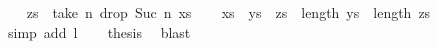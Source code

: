 \begin{isabellebody}
\ \ \isamarkupfalse%
\ {\isacharquery}{\kern0pt}zs\ {\isacharequal}{\kern0pt}\ {\isachardoublequoteopen}take\ n\ {\isacharparenleft}{\kern0pt}drop\ {\isacharparenleft}{\kern0pt}Suc\ n{\isacharparenright}{\kern0pt}\ xs{\isacharparenright}{\kern0pt}{\isachardoublequoteclose}\isanewline
\ \ \isamarkupfalse%
\ {\isachardoublequoteopen}xs\ {\isacharequal}{\kern0pt}\ {\isacharquery}{\kern0pt}ys\ {\isacharat}{\kern0pt}\ {\isacharquery}{\kern0pt}zs\ {\isasymand}\ length\ {\isacharquery}{\kern0pt}ys\ {\isacharequal}{\kern0pt}\ length\ {\isacharquery}{\kern0pt}zs\ {\isacharplus}{\kern0pt}\ {}{\isachardoublequoteclose}\ \isamarkupfalse%
\ {\isacharparenleft}{\kern0pt}simp\ add{\isacharcolon}{\kern0pt}\ l{\isacharparenright}{\kern0pt}\isanewline
\ \ \isamarkupfalse%
\ {\isacharquery}{\kern0pt}thesis\ \isamarkupfalse%
\ blast\isanewline
{}\isamarkupfalse%
%
\endisatagproof
{\isafoldproof}%
%
\isadelimproof
\isanewline
%
\endisadelimproof
%
\isadelimtheory
\isanewline
%
\endisadelimtheory
%
\isatagtheory
{}\isamarkupfalse%
%
\endisatagtheory
{\isafoldtheory}%
%
\isadelimtheory
%
\endisadelimtheory
%
\end{isabellebody}%
\endinput
